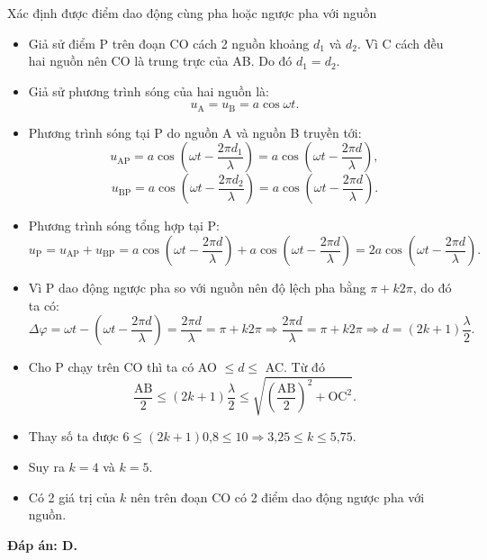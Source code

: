 \begin{dang}{Xác định được điểm dao động cùng pha hoặc ngược pha với nguồn}
{		\begin{itemize}
			\item Giả sử điểm P trên đoạn CO cách 2 nguồn khoảng $d_1$ và $d_2$. Vì C cách đều hai nguồn nên CO là trung trực của AB. Do đó $d_1=d_2$.
			\item Giả sử phương trình sóng của hai nguồn là:
			\begin{equation*}
				u_{\text{A}}=u_{\text{B}} = a \cos \omega t.
			\end{equation*}
			\item Phương trình sóng tại P do nguồn A và nguồn B truyền tới:
			\begin{equation*}
				u_{\text{AP}}= a \cos \left(\omega t - \dfrac{2\pi d_1}{\lambda}\right) = a \cos \left(\omega t - \dfrac{2\pi d}{\lambda}\right),
			\end{equation*}
			\begin{equation*}
				u_{\text{BP}}= a \cos \left(\omega t - \dfrac{2\pi d_2}{\lambda}\right) = a \cos \left(\omega t - \dfrac{2\pi d}{\lambda}\right).
			\end{equation*}
			\item Phương trình sóng tổng hợp tại P:
			\begin{equation*}
				u_{\text{P}}=	u_{\text{AP}} + u_{\text{BP}}= a \cos \left(\omega t - \dfrac{2\pi d}{\lambda}\right) + a \cos \left(\omega t - \dfrac{2\pi d}{\lambda}\right) = 2a\cos \left(\omega t - \dfrac{2\pi d}{\lambda}\right).
			\end{equation*}
			\item Vì P dao động ngược pha so với nguồn nên độ lệch pha bằng $\pi + k2\pi$, do đó ta có:
			\begin{equation*}
				\Delta \varphi = \omega t - \left(\omega t - \dfrac{2\pi d}{\lambda}\right) =\dfrac{2\pi d}{\lambda} = \pi + k2\pi \Rightarrow \dfrac{2\pi d}{\lambda} = \pi +k2\pi \Rightarrow d = (2k+1) \dfrac{\lambda}{2}.
			\end{equation*}	
			\item Cho P chạy trên CO thì ta có AO $\leq d \leq$ AC. Từ đó
			\begin{equation*}
				\dfrac{\text{AB}}{2} \leq (2k+1) \dfrac{\lambda}{2} \leq \sqrt {\left(\dfrac{\text{AB}}{2}\right)^2 + \text{OC}^2}.
			\end{equation*}
			\item Thay số ta được $6 \leq (2k+1) \text{0,8} \leq 10 \Rightarrow \text{3,25} \leq k \leq \text{5,75}.$
			\item Suy ra $k=4$ và $k=5$.
			\item Có 2 giá trị của $k$ nên trên đoạn CO có 2 điểm dao động ngược pha với nguồn.
		\end{itemize}
		
		\textbf{Đáp án: D.}
	}
\end{dang}
